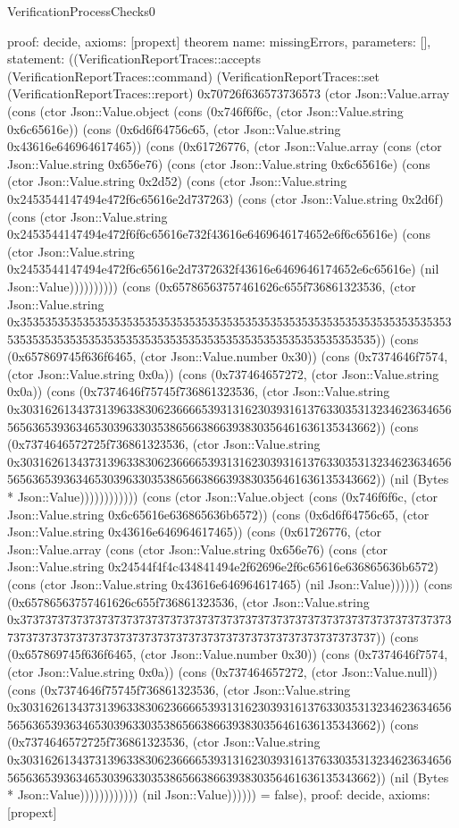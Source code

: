 \begin{lexlean}{VerificationProcessChecks0}
\begin{semanticmodule}
{  proof: decide{},
  axioms: [propext]
}
theorem{
  name: missingErrors,
  parameters: [],
  statement: ((VerificationReportTraces::accepts (VerificationReportTraces::command) (VerificationReportTraces::set (VerificationReportTraces::report) 0x70726f636573736573 (ctor Json::Value.array (cons (ctor Json::Value.object (cons (0x746f6f6c, (ctor Json::Value.string 0x6c65616e)) (cons (0x6d6f64756c65, (ctor Json::Value.string 0x43616e646964617465)) (cons (0x61726776, (ctor Json::Value.array (cons (ctor Json::Value.string 0x656e76) (cons (ctor Json::Value.string 0x6c65616e) (cons (ctor Json::Value.string 0x2d52) (cons (ctor Json::Value.string 0x2453544147494e472f6c65616e2d737263) (cons (ctor Json::Value.string 0x2d6f) (cons (ctor Json::Value.string 0x2453544147494e472f6f6c65616e732f43616e6469646174652e6f6c65616e) (cons (ctor Json::Value.string 0x2453544147494e472f6c65616e2d7372632f43616e6469646174652e6c65616e) (nil Json::Value)))))))))) (cons (0x65786563757461626c655f736861323536, (ctor Json::Value.string 0x35353535353535353535353535353535353535353535353535353535353535353535353535353535353535353535353535353535353535353535353535353535)) (cons (0x657869745f636f6465, (ctor Json::Value.number 0x30)) (cons (0x7374646f7574, (ctor Json::Value.string 0x0a)) (cons (0x737464657272, (ctor Json::Value.string 0x0a)) (cons (0x7374646f75745f736861323536, (ctor Json::Value.string 0x30316261343731396338306236666539313162303931613763303531323462363465656563653936346530396330353865663866393830356461636135343662)) (cons (0x7374646572725f736861323536, (ctor Json::Value.string 0x30316261343731396338306236666539313162303931613763303531323462363465656563653936346530396330353865663866393830356461636135343662)) (nil (Bytes * Json::Value)))))))))))) (cons (ctor Json::Value.object (cons (0x746f6f6c, (ctor Json::Value.string 0x6c65616e636865636b6572)) (cons (0x6d6f64756c65, (ctor Json::Value.string 0x43616e646964617465)) (cons (0x61726776, (ctor Json::Value.array (cons (ctor Json::Value.string 0x656e76) (cons (ctor Json::Value.string 0x24544f4f4c434841494e2f62696e2f6c65616e636865636b6572) (cons (ctor Json::Value.string 0x43616e646964617465) (nil Json::Value)))))) (cons (0x65786563757461626c655f736861323536, (ctor Json::Value.string 0x37373737373737373737373737373737373737373737373737373737373737373737373737373737373737373737373737373737373737373737373737373737)) (cons (0x657869745f636f6465, (ctor Json::Value.number 0x30)) (cons (0x7374646f7574, (ctor Json::Value.string 0x0a)) (cons (0x737464657272, (ctor Json::Value.null)) (cons (0x7374646f75745f736861323536, (ctor Json::Value.string 0x30316261343731396338306236666539313162303931613763303531323462363465656563653936346530396330353865663866393830356461636135343662)) (cons (0x7374646572725f736861323536, (ctor Json::Value.string 0x30316261343731396338306236666539313162303931613763303531323462363465656563653936346530396330353865663866393830356461636135343662)) (nil (Bytes * Json::Value)))))))))))) (nil Json::Value)))))) = false),
  proof: decide{},
  axioms: [propext]
}
\end{semanticmodule}
\end{lexlean}
